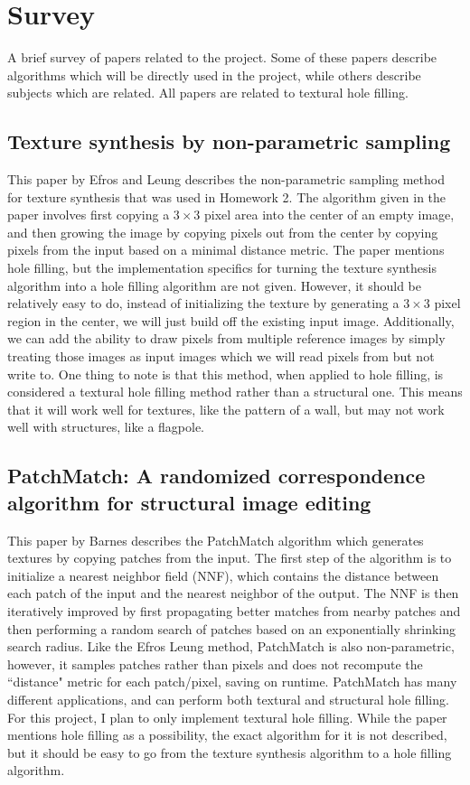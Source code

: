 \section{Survey}
\label{sec:survey}

A brief survey of papers related to the project. Some of these papers describe algorithms which will be directly used in the project, while others describe subjects which are related. All papers are related to textural hole filling.

\subsection*{Texture synthesis by non-parametric sampling \cite{efros1999texture}}
This paper by Efros and Leung describes the non-parametric sampling method for texture synthesis that was used in Homework 2. The algorithm given in the paper involves first copying a $3\times3$ pixel area into the center of an empty image, and then growing the image by copying pixels out from the center by copying pixels from the input based on a minimal distance metric. The paper mentions hole filling, but the implementation specifics for turning the texture synthesis algorithm into a hole filling algorithm are not given. However, it should be relatively easy to do, instead of initializing the texture by generating a $3\times3$ pixel region in the center, we will just build off the existing input image. Additionally, we can add the ability to draw pixels from multiple reference images by simply treating those images as input images which we will read pixels from but not write to. One thing to note is that this method, when applied to hole filling, is considered a textural hole filling method rather than a structural one. This means that it will work well for textures, like the pattern of a wall, but may not work well with structures, like a flagpole.
\subsection*{PatchMatch: A randomized correspondence algorithm for structural image editing \cite{barnes2009patchmatch}}
This paper by Barnes \etal describes the PatchMatch algorithm which generates textures by copying patches from the input. The first step of the algorithm is to initialize a nearest neighbor field (NNF), which contains the distance between each patch of the input and the nearest neighbor of the output. The NNF is then iteratively improved by first propagating better matches from nearby patches and then performing a random search of patches based on an exponentially shrinking search radius.
Like the Efros Leung method, PatchMatch is also non-parametric, however, it samples patches rather than pixels and does not recompute the ``distance" metric for each patch/pixel, saving on runtime. PatchMatch has many different applications, and can perform both textural and structural hole filling. For this project, I plan to only implement textural hole filling. While the paper mentions hole filling as a possibility, the exact algorithm for it is not described, but it should be easy to go from the texture synthesis algorithm to a hole filling algorithm.

